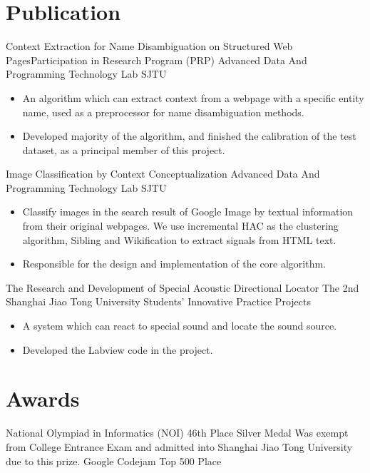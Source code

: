 \documentclass[10pt,a4paper,roman]{moderncv} %
\begin{document}
\section{Publication}
        {Context Extraction for Name Disambiguation on Structured Web Pages}{Participation in Research Program (PRP)}
        {Advanced Data And Programming Technology Lab\footnotemark{}}
        {SJTU}
        {\begin{itemize}
          \item{An algorithm which can extract context from a webpage with a specific entity name, used as a preprocessor for name disambiguation methods.}
          \item{Developed majority of the algorithm, and finished the calibration of the test dataset, as a principal member of this project.}
         \end{itemize}
        }
        {Image Classification by Context Conceptualization}
        {}
        {Advanced Data And Programming Technology Lab}
        {SJTU}
        {\begin{itemize}
          \item{Classify images in the search result of Google Image by textual information from their original webpages. We use incremental HAC as the clustering algorithm, Sibling and Wikification to extract signals from HTML text.}
          \item{Responsible for the design and implementation of the core algorithm.}
         \end{itemize}
        }
        {The Research and Development of Special Acoustic Directional Locator}
        {The 2nd Shanghai Jiao Tong University Students' Innovative Practice Projects}
        {}
        {}
        {\begin{itemize}
          \item{A system which can react to special sound and locate the sound source.}
          \item{Developed the Labview code in the project.}
         \end{itemize}
        }

\section{Awards}
        {National Olympiad in Informatics (NOI)}
        {46th Place}
        {Silver Medal}
        {}
        {Was exempt from College Entrance Exam and admitted into Shanghai Jiao Tong University due to this prize.}
        {Google Codejam}
        {Top 500 Place}
        {}{}{}
\end{document}
